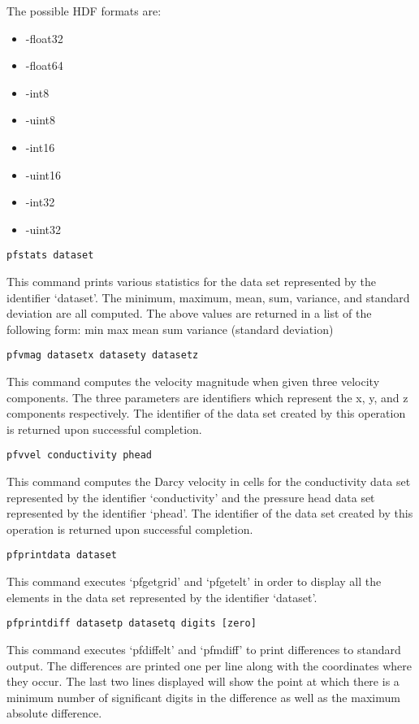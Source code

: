 \begin{description}
The possible HDF formats are:
\begin{itemize}
\item{-float32}
\item{-float64}
\item{-int8}
\item{-uint8}
\item{-int16}
\item{-uint16}
\item{-int32}
\item{-uint32}
\end{itemize}

       
\item{\begin{verbatim}pfstats dataset\end{verbatim}}
This command prints various statistics for the data set represented by
the identifier `dataset'.  The minimum, maximum, mean, sum, variance,
and standard deviation are all computed.  The above values are
returned in a list of the following form:
{min max mean sum variance (standard deviation)}
        
        
\item{\begin{verbatim}pfvmag datasetx datasety datasetz\end{verbatim}}
This command computes the velocity magnitude when given three velocity
components.  The three parameters are identifiers which represent
the x, y, and z components respectively.  The identifier of the data
set created by this operation is returned upon successful completion.


\item{\begin{verbatim}pfvvel conductivity phead\end{verbatim}}
This command computes the Darcy velocity in cells for the conductivity
data set represented by the identifier `conductivity' and the pressure
head data set represented by the identifier `phead'.  The identifier  
of the data set created by this operation is returned upon successful 
completion.  

        
\item{\begin{verbatim}pfprintdata dataset\end{verbatim}}
This command executes `pfgetgrid' and `pfgetelt' in order to display
all the elements in the data set represented by the identifier
`dataset'.
        
        
\item{\begin{verbatim}pfprintdiff datasetp datasetq digits [zero]\end{verbatim}}
This command executes `pfdiffelt' and `pfmdiff' to print differences
to standard output.  The differences are printed one per line along
with the coordinates where they occur.  The last two lines displayed  
will show the point at which there is a minimum number of significant 
digits in the difference as well as the maximum absolute difference.
        

\end{description}
